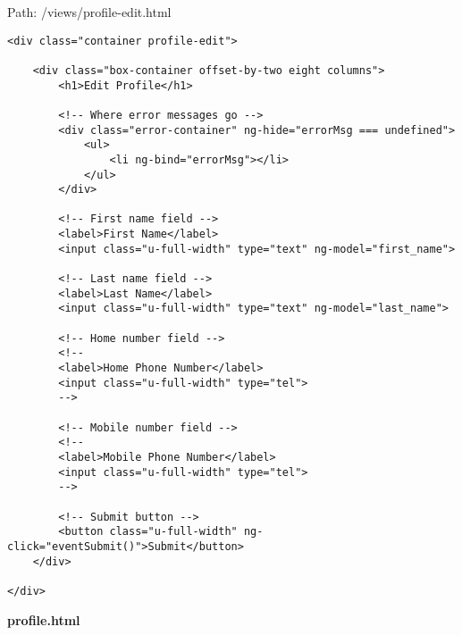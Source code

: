 Path: /views/profile-edit.html
{\scriptsize
\begin{lstlisting}
<div class="container profile-edit">

	<div class="box-container offset-by-two eight columns">
		<h1>Edit Profile</h1>

		<!-- Where error messages go -->
		<div class="error-container" ng-hide="errorMsg === undefined">
			<ul>
				<li ng-bind="errorMsg"></li>
			</ul>
		</div>

		<!-- First name field -->
		<label>First Name</label>
		<input class="u-full-width" type="text" ng-model="first_name">

		<!-- Last name field -->
		<label>Last Name</label>
		<input class="u-full-width" type="text" ng-model="last_name">

		<!-- Home number field -->
		<!--
		<label>Home Phone Number</label>
		<input class="u-full-width" type="tel">
		-->

		<!-- Mobile number field -->
		<!--
		<label>Mobile Phone Number</label>
		<input class="u-full-width" type="tel">
		-->

		<!-- Submit button -->
		<button class="u-full-width" ng-click="eventSubmit()">Submit</button>
	</div>

</div>\end{lstlisting}
}
\textbf{profile.html}

